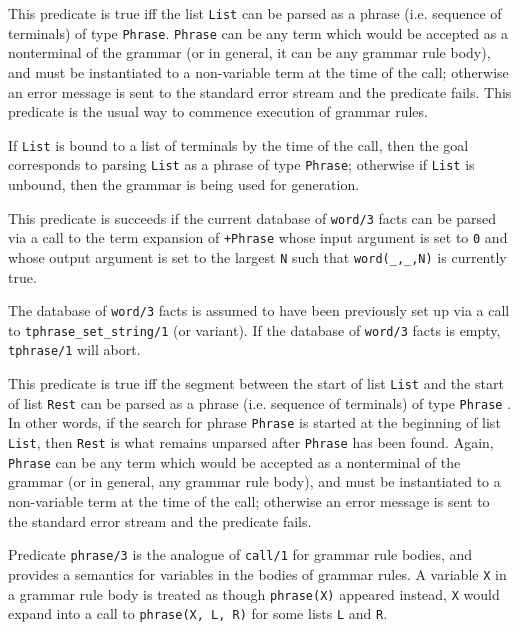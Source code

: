 \begin{description}

    This predicate is true iff the list {\tt List} can be parsed as a phrase 
    (i.e. sequence of terminals) of type {\tt Phrase}.  {\tt Phrase} can be 
    any term which would
    be accepted as a nonterminal of the grammar (or in general, it can 
    be any  grammar rule body), and must be instantiated to a
    non-variable term  at the time of the call; otherwise an error
    message is sent to the standard error stream and the predicate fails. 
    This predicate is the usual way to commence execution of grammar rules.

    If {\tt List} is bound to a list of terminals by the time of the call,
    then the goal corresponds to parsing {\tt List} as a phrase of type
    {\tt Phrase}; otherwise if {\tt List} is unbound, then the grammar
    is being used for generation.

 This predicate is
    succeeds if the current database of {\tt word/3} facts can be
    parsed via a call to the term expansion of {\tt +Phrase} whose
    input argument is set to {\tt 0} and whose output argument is set
    to the largest {\tt N} such that {\tt word(\_,\_,N)} is currently
    true.  

    The database of {\tt word/3} facts is assumed to have been
    previously set up via a call to {\tt tphrase\_set\_string/1} (or variant).  If
    the database of {\tt word/3} facts is empty, {\tt tphrase/1} will
    abort.


    This predicate is true iff the segment between the start of list 
    {\tt List} and the start of list {\tt Rest} can be parsed as a phrase 
    (i.e. sequence of terminals) of type {\tt Phrase} . In other words, if 
    the search for phrase 
    {\tt Phrase} is started at the beginning of list {\tt List}, then 
    {\tt Rest} is what remains unparsed after {\tt Phrase} has been
    found. Again, {\tt Phrase} can be any term which
    would be accepted as a nonterminal of the grammar (or in general, any
    grammar rule body), and must be instantiated to a non-variable term
    at the time of the call; otherwise an error message is sent to the
    standard error stream and the predicate fails.

    Predicate {\tt phrase/3} is the analogue of {\tt call/1} for grammar
    rule bodies, and provides a semantics for variables in the bodies of
    grammar rules.  A variable {\tt X} in a grammar rule body is treated
    as though {\tt phrase(X)} appeared instead, {\tt X} would expand into 
    a call to {\tt phrase(X, L, R)} for some lists {\tt L} and {\tt R}.  


\end{description}
